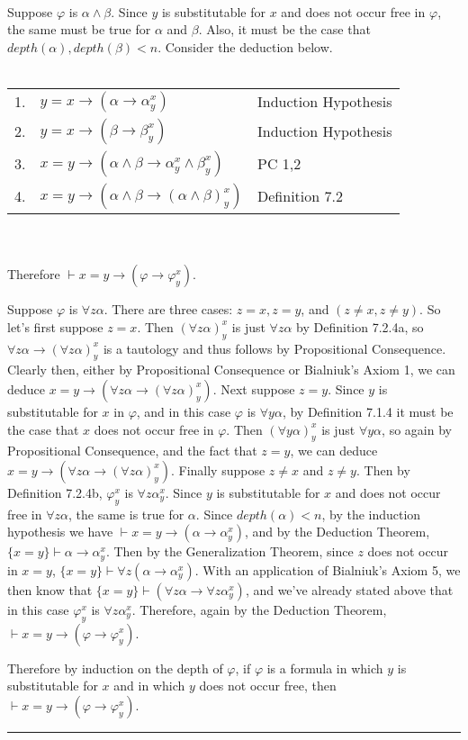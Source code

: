 \documentclass[11pt]{hmcpset}
\newenvironment{problem2}[1]{\noindent {\bf (#1}}
{\medskip}
\newenvironment{proof}{\noindent {\bf Proof:} \\}{\hfill
\rule{1mm}{3mm} \bigskip}
\begin{document}
\begin{problem2}{b)}
\begin{proof}
Suppose $\varphi$ is $\alpha\land\beta.$ Since $y$ is substitutable for $x$ and does not occur free in $\varphi$, the same must be true for $\alpha$ and $\beta$. Also, it must be the case that $depth(\alpha),depth(\beta)<n$. Consider the deduction below.\\\\
\begin{tabular}{rll}
1. & $y=x\to(\alpha\to\alpha_y^x)$ & Induction Hypothesis\\
2. & $y=x\to(\beta\to\beta_y^x)$ & Induction Hypothesis\\
3. & $x=y\to(\alpha\land\beta\to\alpha_y^x\land\beta_y^x)$   &  PC 1,2\\
4. & $x=y\to(\alpha\land\beta\to(\alpha\land\beta)_y^x)$   &  Definition 7.2\end{tabular}\\\\
Therefore $\vdash x=y\to(\varphi\to\varphi_y^x)$.

Suppose $\varphi$ is $\forall z\alpha$. There are three cases: $z=x, z=y$, and $(z\ne x, z\ne y).$ So let's first suppose $z=x$. Then $(\forall z\alpha)_y^x$ is just $\forall z\alpha$ by Definition 7.2.4a, so $\forall z\alpha\to(\forall z\alpha)_y^x$ is a tautology and thus follows by Propositional Consequence. Clearly then, either by Propositional Consequence or Bialniuk's Axiom 1, we can deduce $x=y\to(\forall z\alpha\to(\forall z\alpha)_y^x)$. Next suppose $z=y$. Since $y$ is substitutable for $x$ in $\varphi$, and in this case $\varphi$ is $\forall y\alpha$, by Definition 7.1.4 it must be the case that $x$ does not occur free in $\varphi$. Then $(\forall y\alpha)_y^x$ is just $\forall y\alpha$, so again by Propositional Consequence, and the fact that $z=y$, we can deduce $x=y\to(\forall z\alpha\to(\forall z\alpha)_y^x)$. Finally suppose $z\ne x$ and $z\ne y$. Then by Definition 7.2.4b, $\varphi_y^x$ is $\forall z\alpha_y^x$. Since $y$ is substitutable for $x$ and does not occur free in $\forall z\alpha$, the same is true for $\alpha$. Since $depth(\alpha)<n$, by the induction hypothesis we have $\vdash x=y\to(\alpha\to\alpha_y^x)$, and by the Deduction Theorem, $\{x=y\}\vdash\alpha\to\alpha_y^x$. Then by the Generalization Theorem, since $z$ does not occur in $x=y$, $\{x=y\}\vdash\forall z (\alpha\to\alpha_y^x).$ With an application of Bialniuk's Axiom 5, we then know that $\{x=y\}\vdash(\forall z\alpha\to\forall z\alpha_y^x)$, and we've already stated above that in this case $\varphi_y^x$ is $\forall z\alpha_y^x$. Therefore, again by the Deduction Theorem, $ \vdash x=y\to(\varphi\to\varphi_y^x)$.

Therefore by induction on the depth of $\varphi$, if $\varphi$ is a formula in which $y$ is substitutable for $x$ and in which $y$ does not occur free, then $ \vdash x=y\to(\varphi\to\varphi_y^x)$.
\end{proof}
\end{problem2}
\end{document}
